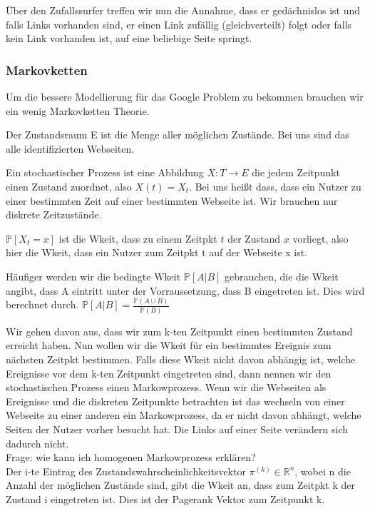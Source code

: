 \documentclass[]{article}
\begin{document}
Über den Zufallssurfer treffen wir nun die Annahme, dass er gedächnislos ist und falls Links vorhanden sind, er einen Link zufällig (gleichverteilt) folgt oder falls kein Link vorhanden ist, auf eine beliebige Seite springt. 

\subsubsection{Markovketten}
Um die bessere Modellierung für das Google Problem zu bekommen brauchen wir ein wenig Markovketten Theorie. 

Der Zustandsraum E ist die Menge aller möglichen Zustände. Bei uns sind das alle identifizierten Webseiten.

 Ein stochastischer Prozess ist eine Abbildung $X:T \rightarrow E$ die jedem Zeitpunkt einen Zustand zuordnet, also $X(t)=X_t$. Bei uns heißt dass, dass ein Nutzer zu einer bestimmten Zeit auf einer bestimmten Webseite ist.  Wir brauchen nur diskrete Zeitzustände. 
 
 $\mathbb{P}[X_t=x]$ ist die Wkeit, dass zu einem Zeitpkt $t$ der Zustand $x$ vorliegt, also hier die Wkeit, dass ein Nutzer zum Zeitpkt t auf der Webseite x ist. 
 
Häufiger werden wir die bedingte Wkeit $\mathbb{P}[A|B]$ gebrauchen, die die Wkeit angibt, dass A eintritt unter der Vorraussetzung, dass B eingetreten ist. Dies wird berechnet durch. $\mathbb{P}[A|B]= \frac{\mathbb{P}(A \cup B)}{\mathbb{P}(B)}$

Wir gehen davon aus, dass wir zum k-ten Zeitpunkt einen bestimmten Zustand erreicht haben. Nun wollen wir die Wkeit für ein bestimmtes Ereignis zum nächsten Zeitpkt bestimmen. Falls diese Wkeit nicht davon abhängig ist, welche Ereignisse vor dem k-ten Zeitpunkt eingetreten sind, dann nennen wir den stochastischen Prozess einen Markowprozess. Wenn wir die Webseiten als Ereignisse und die diskreten Zeitpunkte betrachten ist das wechseln von einer Webseite zu einer anderen ein Markowprozess, da er nicht davon abhängt, welche Seiten der Nutzer vorher besucht hat. Die Links auf einer Seite verändern sich dadurch nicht. \\

Frage: wie kann ich homogenen Markowprozess erklären? \\

Der i-te Eintrag des Zustandswahrscheinlichkeitsvektor $\pi^{(k)} \in \mathbb{R}^n$, wobei n die Anzahl der möglichen Zustände sind, gibt die Wkeit an, dass zum Zeitpkt k der Zustand i eingetreten ist.  Dies ist der Pagerank Vektor zum Zeitpunkt k. 
\end{document}
